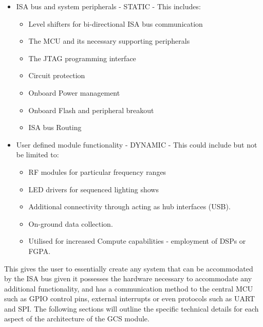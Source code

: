 \begin{itemize}
    \item ISA bus and system peripherals - STATIC - This includes:
    \begin{itemize}
        \item Level shifters for bi-directional ISA bus communication
        \item The MCU and its necessary supporting peripherals 
        \item The JTAG programming interface
        \item Circuit protection
        \item Onboard Power management
        \item Onboard Flash and peripheral breakout
        \item ISA bus Routing
    \end{itemize}
    \item User defined module functionality - DYNAMIC - This could include but not be limited to:
    \begin{itemize}
        \item RF modules for particular frequency ranges
        \item LED drivers for sequenced lighting shows
        \item Additional connectivity through acting as hub interfaces (USB).
        \item On-ground data collection.
        \item Utilised for increased Compute capabilities - employment of DSPs or FGPA.
    \end{itemize}
\end{itemize}
This gives the user to essentially create any system that can be accommodated by the ISA bus given it possesses the hardware necessary to accommodate any additional functionality, and has a communication method to the central MCU such as GPIO control pins, external interrupts or even protocols such as UART and SPI. The following sections will outline the specific technical details for each aspect of the architecture of the GCS module.
